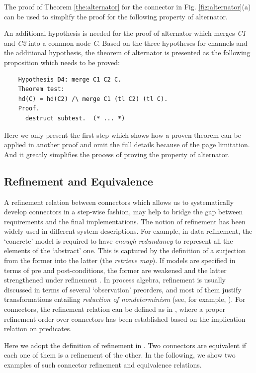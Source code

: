 \documentclass{llncs}
\begin{document}
\begin{example}
The proof of Theorem \ref{the:alternator} for the connector in Fig. \ref{fig:alternator}(a) can be used to simplify the proof for the following
property of alternator.

An additional hypothesis is needed for the proof of alternator which merges \emph{C1} and \emph{C2} into a common node \emph{C}. Based on the three
hypotheses for channels and the additional hypothesis, the theorem of alternator is presented as the following proposition which needs to be proved:
\begin{verbatim}
    Hypothesis D4: merge C1 C2 C.
    Theorem test:
    hd(C) = hd(C2) /\ merge C1 (tl C2) (tl C).
    Proof.
      destruct subtest.  (* ... *)
\end{verbatim}
Here we only present the first step which shows how a proven theorem can be applied in another proof and omit the full details because of the page limitation.
And it greatly simplifies the process of proving the property of alternator.
\end{example}

\subsection{Refinement and Equivalence}

A refinement relation between connectors which allows us to systematically develop connectors in a step-wise fashion, may help to bridge
the gap between requirements and the final implementations. The notion of refinement has been widely used in different system descriptions.
For example, in data refinement\cite{RE98}, the `concrete' model is required to have \emph{enough redundancy} to represent all the elements
of the `abstract' one. This is captured by the definition of a surjection from the former into the latter (the \emph{retrieve map}). If
models are specified in terms of pre and post-conditions, the former are weakened and the latter strengthened under refinement \cite{Jon90}.
In process algebra, refinement is usually discussed in terms of several `observation' preorders, and most of them justify
transformations entailing \emph{reduction of nondeterminism} (see, for
example, \cite{Ros98}). For connectors, the refinement relation can be
defined as in \cite{SAA+12}, where a proper refinement order over
connectors has been established based on the implication relation on
predicates.

Here we adopt the definition of refinement in \cite{SAA+12}. Two connectors are equivalent if each one of them is a refinement of the other.
In the following, we show two examples of such connector refinement and equivalence relations.
\end{document}
